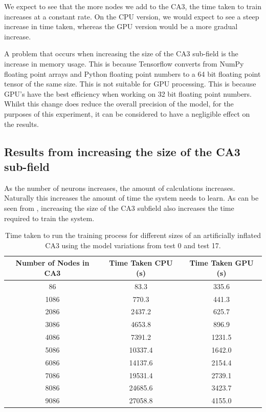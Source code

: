 We expect to see that the more nodes we add to the CA3, the time taken to train increases at a constant rate.
On the CPU version, we would expect to see a steep increase in time taken, whereas the GPU version would be a more gradual increase.


A problem that occurs when increasing the size of the CA3 sub-field is the increase in memory usage.
This is because Tensorflow converts from NumPy floating point arrays and Python floating point numbers to a 64 bit floating point tensor of the same size.
This is not suitable for GPU processing.
This is because GPU's have the best efficiency when working on 32 bit floating point numbers.
Whilst this change does reduce the overall precision of the model, for the purposes of this experiment, it can be considered to have a negligible effect on the results.

\subsection{Results from increasing the size of the CA3 sub-field}
As the number of neurons increases, the amount of calculations increases. 
Naturally this increases the amount of time the system needs to learn.
As can be seen from , increasing the size of the CA3 subfield also increases the time required to train the system.
\begin{table}[ht]
    \centering
        \begin{tabular}{|c|c|c|}
            \hline
            Number of Nodes in CA3 & Time Taken CPU (s) & Time Taken GPU (s) \\\hline
            86      & 83.3           & 335.6          \\ \hline
            1086    & 770.3          & 441.3          \\ \hline
            2086    & 2437.2         & 625.7          \\ \hline
            3086    & 4653.8         & 896.9          \\ \hline
            4086    & 7391.2         & 1231.5         \\ \hline
            5086    & 10337.4        & 1642.0         \\ \hline
            6086    & 14137.6        & 2154.4         \\ \hline
            7086    & 19531.4        & 2739.1         \\ \hline
            8086    & 24685.6        & 3423.7         \\ \hline
            9086    & 27058.8        & 4155.0         \\ \hline
        \end{tabular}
    \caption{
        Time taken to run the training process for different sizes of an artificially inflated CA3 using the model variations from test 0 and test 17.\footnotemark
    }
    \label{tab:results_table_size}
\end{table}




